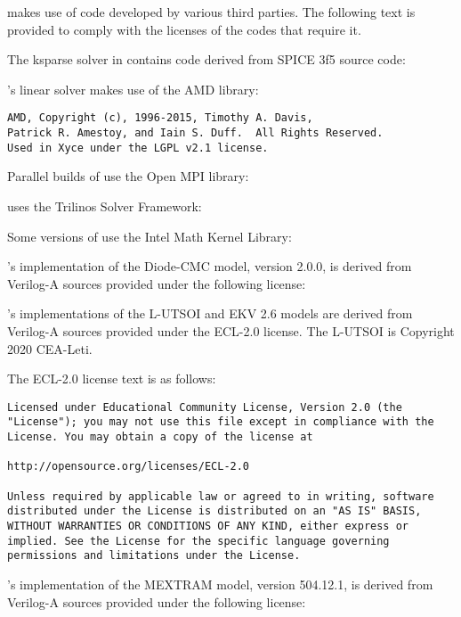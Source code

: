 \Xyce{} makes use of code developed by various third parties.  The following
text is provided to comply with the licenses of the codes that require it.

The ksparse solver in \Xyce{} contains code derived from SPICE 3f5 source code:


\Xyce{}'s linear solver makes use of the AMD library:
\begin{verbatim}
AMD, Copyright (c), 1996-2015, Timothy A. Davis,
Patrick R. Amestoy, and Iain S. Duff.  All Rights Reserved.
Used in Xyce under the LGPL v2.1 license.
\end{verbatim}

Parallel builds of \Xyce{} use the Open MPI library:


\Xyce{} uses the Trilinos Solver Framework:


Some versions of \Xyce{} use the Intel Math Kernel Library:


\Xyce{}'s implementation of the Diode-CMC model, version 2.0.0, is derived from
Verilog-A sources provided under the following license:


\Xyce{}'s implementations of the L-UTSOI and EKV 2.6 models are derived from
Verilog-A sources provided under the ECL-2.0 license. The L-UTSOI is
Copyright 2020 CEA-Leti.

The ECL-2.0 license text is as follows:
\begin{verbatim}
Licensed under Educational Community License, Version 2.0 (the
"License"); you may not use this file except in compliance with the
License. You may obtain a copy of the license at

http://opensource.org/licenses/ECL-2.0

Unless required by applicable law or agreed to in writing, software
distributed under the License is distributed on an "AS IS" BASIS,
WITHOUT WARRANTIES OR CONDITIONS OF ANY KIND, either express or
implied. See the License for the specific language governing
permissions and limitations under the License.
\end{verbatim}

\Xyce{}'s implementation of the MEXTRAM model, version 504.12.1, is derived
from Verilog-A sources provided under the following license:


